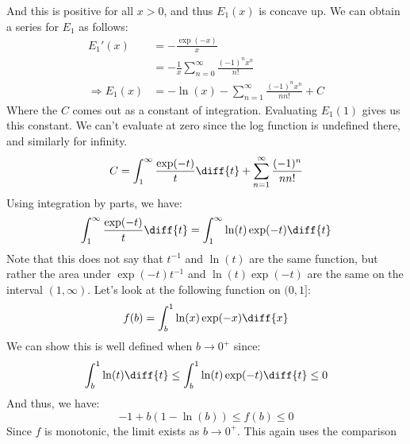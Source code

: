 \documentclass[crop=false,class=book,oneside]{standalone}
\begin{document}
            And this is positive for all $x>0$, and thus
            $E_{1}(x)$ is concave up. We can obtain a series for
            $E_{1}$ as follows:
            \begin{align}
                E_{1}'(x)&=-\frac{\exp(-x)}{x}\\
                &=-\frac{1}{x}\sum_{n=0}^{\infty}
                    \frac{(-1)^{n}x^{n}}{n!}\\
                \Rightarrow
                E_{1}(x)&=-\ln(x)-\sum_{n=1}^{\infty}
                    \frac{(-1)^{n}x^{n}}{nn!}+C
            \end{align}
            Where the $C$ comes out as a constant of integration.
            Evaluating $E_{1}(1)$ gives us this constant.
            We can't evaluate at zero since the log function is
            undefined there, and similarly for infinity.
            \begin{equation}
                C=\int_{1}^{\infty}\frac{\exp(-t)}{t}\diff{t}
                +\sum_{n=1}^{\infty}\frac{(-1)^{n}}{nn!}
            \end{equation}
            Using integration by parts, we have:
            \begin{equation}
                \int_{1}^{\infty}\frac{\exp(-t)}{t}\diff{t}
                =\int_{1}^{\infty}\ln(t)\exp(-t)\diff{t}
            \end{equation}
            Note that this does not say that $t^{-1}$ and
            $\ln(t)$ are the same function, but rather the
            area under $\exp(-t)t^{-1}$ and $\ln(t)\exp(-t)$
            are the same on the interval $(1,\infty)$.
            Let's look at the following function on $(0,1]$:
            \begin{equation}
                f(b)=\int_{b}^{1}\ln(x)\exp(-x)\diff{x}
            \end{equation}
            We can show this is well defined when
            $b\rightarrow{0}^{+}$ since:
            \begin{equation}
                \int_{b}^{1}\ln(t)\diff{t}
                \leq\int_{b}^{1}\ln(t)\exp(-t)\diff{t}
                \leq{0}
            \end{equation}
            And thus, we have:
            \begin{equation}
                -1+b(1-\ln(b))\leq{f}(b)\leq{0}
            \end{equation}
            Since $f$ is monotonic, the limit exists as
            $b\rightarrow{0}^{+}$. This again uses the comparison
\end{document}

